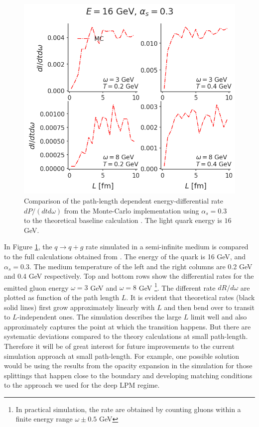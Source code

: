 \documentclass[aps, prc, reprint, amsmath, groupedaddress, nofootinbib]{revtex4-1}
\begin{document}
\begin{figure}
\includegraphics[width=\columnwidth]{spectrum_L.png}
\caption{Comparison of the path-length dependent energy-differential rate $dP/(dtd\omega)$ from the Monte-Carlo implementation using $\alpha_s = 0.3$ to the theoretical baseline calculation \cite{CaronHuot:2010bp}. The light quark energy is $16$ GeV.}
\label{fig:spectra-L-alphas=0.3}
\end{figure}

In Figure \ref{fig:spectra-L-alphas=0.3}, the $q\rightarrow q+g$ rate simulated in a semi-infinite medium is compared to the full calculations obtained from \cite{CaronHuot:2010bp}.
The energy of the quark is 16 GeV, and $\alpha_s = 0.3$.
The medium temperature of the left and the right columns are 0.2 GeV and 0.4 GeV respectively.
Top and bottom rows show the differential rates for the emitted gluon  energy $\omega = 3$ GeV and $\omega = 8$ GeV \footnote{In practical simulation, the rate are obtained by counting gluons within a finite energy range $\omega\pm 0.5$ GeV}.
The different rate $dR/d\omega$ are plotted as function of the path length $L$.
It is evident that theoretical rates (black solid lines) first grow approximately linearly with $L$ and then bend over to transit to $L$-independent ones.
The simulation describes the large $L$ limit well and also approximately captures the point at which the transition happens.
But there are systematic deviations compared to the theory calculations at small path-length.
Therefore it will be of great interest for future improvements to the current simulation approach at small path-length. 
For example, one possible solution would be using the results from the opacity expansion in the simulation for those splittings that happen close to the boundary and developing matching conditions to the approach we used for the deep LPM regime.
\end{document}
